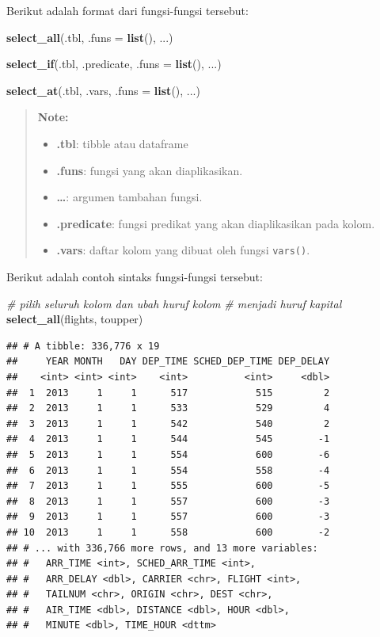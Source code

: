 \documentclass[]{book}
\newenvironment{Shaded}{\begin{snugshade}}{\end{snugshade}}
\newcommand{\KeywordTok}[1]{\textcolor[rgb]{0.13,0.29,0.53}{\textbf{#1}}}
\newcommand{\DataTypeTok}[1]{\textcolor[rgb]{0.13,0.29,0.53}{#1}}
\newcommand{\CommentTok}[1]{\textcolor[rgb]{0.56,0.35,0.01}{\textit{#1}}}
\newcommand{\NormalTok}[1]{#1}
\providecommand{\tightlist}{%
  \setlength{\itemsep}{0pt}\setlength{\parskip}{0pt}}
\begin{document}
Berikut adalah format dari fungsi-fungsi tersebut:

\begin{Shaded}
\begin{Highlighting}[]
\KeywordTok{select_all}\NormalTok{(.tbl, }\DataTypeTok{.funs =} \KeywordTok{list}\NormalTok{(), ...)}

\KeywordTok{select_if}\NormalTok{(.tbl, .predicate, }\DataTypeTok{.funs =} \KeywordTok{list}\NormalTok{(), ...)}

\KeywordTok{select_at}\NormalTok{(.tbl, .vars, }\DataTypeTok{.funs =} \KeywordTok{list}\NormalTok{(), ...)}
\end{Highlighting}
\end{Shaded}

\begin{quote}
\textbf{Note: }

\begin{itemize}
\tightlist
\item
  \textbf{.tbl}: tibble atau dataframe
\item
  \textbf{.funs}: fungsi yang akan diaplikasikan.
\item
  \textbf{\ldots{}}: argumen tambahan fungsi.
\item
  \textbf{.predicate}: fungsi predikat yang akan diaplikasikan pada
  kolom.
\item
  \textbf{.vars}: daftar kolom yang dibuat oleh fungsi \texttt{vars()}.
\end{itemize}
\end{quote}

Berikut adalah contoh sintaks fungsi-fungsi tersebut:

\begin{Shaded}
\begin{Highlighting}[]
\CommentTok{# pilih seluruh kolom dan ubah huruf kolom }
\CommentTok{# menjadi huruf kapital}
\KeywordTok{select_all}\NormalTok{(flights, toupper)}
\end{Highlighting}
\end{Shaded}

\begin{verbatim}
## # A tibble: 336,776 x 19
##     YEAR MONTH   DAY DEP_TIME SCHED_DEP_TIME DEP_DELAY
##    <int> <int> <int>    <int>          <int>     <dbl>
##  1  2013     1     1      517            515         2
##  2  2013     1     1      533            529         4
##  3  2013     1     1      542            540         2
##  4  2013     1     1      544            545        -1
##  5  2013     1     1      554            600        -6
##  6  2013     1     1      554            558        -4
##  7  2013     1     1      555            600        -5
##  8  2013     1     1      557            600        -3
##  9  2013     1     1      557            600        -3
## 10  2013     1     1      558            600        -2
## # ... with 336,766 more rows, and 13 more variables:
## #   ARR_TIME <int>, SCHED_ARR_TIME <int>,
## #   ARR_DELAY <dbl>, CARRIER <chr>, FLIGHT <int>,
## #   TAILNUM <chr>, ORIGIN <chr>, DEST <chr>,
## #   AIR_TIME <dbl>, DISTANCE <dbl>, HOUR <dbl>,
## #   MINUTE <dbl>, TIME_HOUR <dttm>
\end{verbatim}
\end{document}
